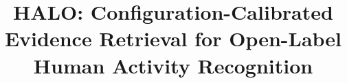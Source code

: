 \documentclass[sigconf, 10pt]{acmart}
\begin{document}
\title{HALO: Configuration-Calibrated Evidence Retrieval for Open-Label Human Activity Recognition}







\end{document}
